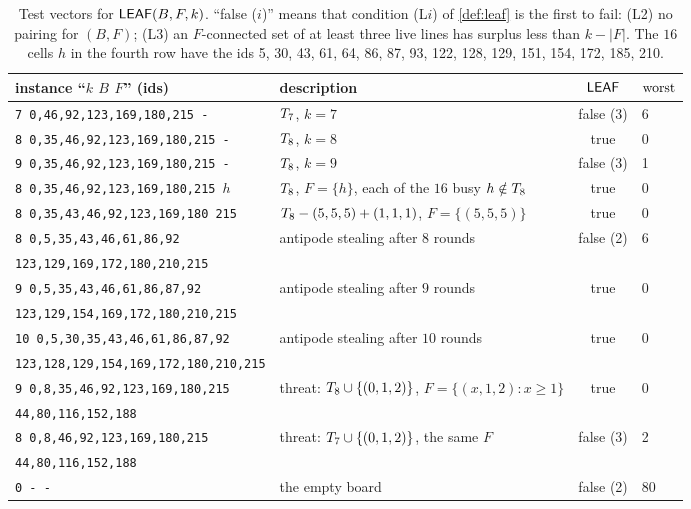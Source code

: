 \begin{table}[ht]
\centering\footnotesize\setlength{\tabcolsep}{2.5pt}
\begin{tabular}{@{}llcl@{}}
\toprule
instance ``$k$ $B$ $F$'' (ids) & description & $\mathsf{LEAF}$ & $\operatorname{worst}$\\
\midrule
\texttt{7 0,46,92,123,169,180,215 -} & $T_7$, $k=7$ & false (3) & 6\\
\texttt{8 0,35,46,92,123,169,180,215 -} & $T_8$, $k=8$ & true & 0\\
\texttt{9 0,35,46,92,123,169,180,215 -} & $T_8$, $k=9$ & false (3) & 1\\
\texttt{8 0,35,46,92,123,169,180,215 }$h$ & $T_8$, $F=\{h\}$, each of the $16$ busy $h\notin T_8$ & true & 0\\
\texttt{8 0,35,43,46,92,123,169,180 215} & $T_8-(5,5,5)+(1,1,1)$, $F=\{(5,5,5)\}$ & true & 0\\
\texttt{8 0,5,35,43,46,61,86,92} & antipode stealing after $8$ rounds & false (2) & 6\\
\quad\texttt{123,129,169,172,180,210,215} & & &\\
\texttt{9 0,5,35,43,46,61,86,87,92} & antipode stealing after $9$ rounds & true & 0\\
\quad\texttt{123,129,154,169,172,180,210,215} & & &\\
\texttt{10 0,5,30,35,43,46,61,86,87,92} & antipode stealing after $10$ rounds & true & 0\\
\quad\texttt{123,128,129,154,169,172,180,210,215} & & &\\
\texttt{9 0,8,35,46,92,123,169,180,215} & threat: $T_8\cup\{(0,1,2)\}$, $F=\{(x,1,2)\colon x\ge1\}$ & true & 0\\
\quad\texttt{44,80,116,152,188} & & &\\
\texttt{8 0,8,46,92,123,169,180,215} & threat: $T_7\cup\{(0,1,2)\}$, the same $F$ & false (3) & 2\\
\quad\texttt{44,80,116,152,188} & & &\\
\texttt{0 - -} & the empty board & false (2) & 80\\
\bottomrule
\end{tabular}
\caption{Test vectors for $\mathsf{LEAF}(B,F,k)$. ``false ($i$)'' means that condition (L$i$) of \cref{def:leaf}
is the first to fail: (L2) no pairing for $(B,F)$; (L3) an $F$-connected set of at least three live lines
has surplus less than $k-|F|$. The $16$ cells $h$ in the fourth row have the ids
5, 30, 43, 61, 64, 86, 87, 93, 122, 128, 129, 151, 154, 172, 185, 210.}
\label{tab:leafvectors}
\end{table}

